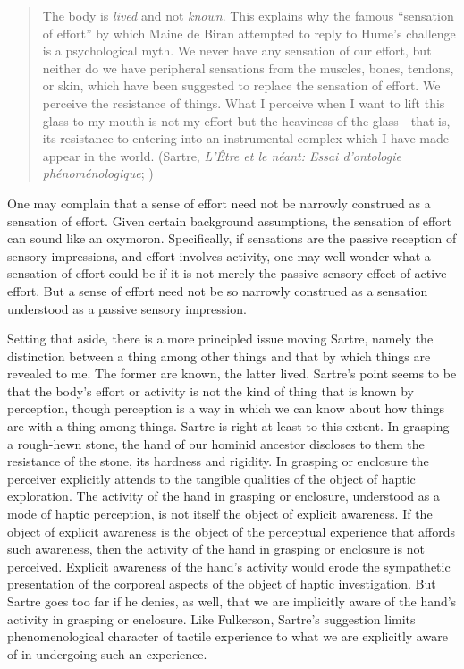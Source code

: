 \begin{quote}
	The body is \emph{lived} and not \emph{known}. This explains why the famous ``sensation of effort'' by which Maine de Biran attempted to reply to Hume's challenge is a psychological myth. We never have any sensation of our effort, but neither do we have peripheral sensations from the muscles, bones, tendons, or skin, which have been suggested to replace the sensation of effort. We perceive the resistance of things. What I perceive when I want to lift this glass to my mouth is not my effort but the heaviness of the glass---that is, its resistance to entering into an instrumental complex which I have made appear in the world. (Sartre, \emph{L'Être et le néant: Essai d'ontologie phénoménologique}; \citealt[324]{Barnes:1958rt})
\end{quote}
One may complain that a sense of effort need not be  narrowly construed as a sensation of effort. Given certain background assumptions, the sensation of effort can sound like an oxymoron. Specifically, if sensations are the passive reception of sensory impressions, and effort involves activity, one may well wonder what a sensation of effort could be if it is not merely the passive sensory effect of active effort. But a sense of effort need not be so narrowly construed as a sensation understood as a passive sensory impression. 

Setting that aside, there is a more principled issue moving Sartre, namely the distinction between a thing among other things and that by which things are revealed to me. The former are known, the latter lived. Sartre's point seems to be that the body's effort or activity is not the kind of thing that is known by perception, though perception is a way in which we can know about how things are with a thing among things. Sartre is right at least to this extent. In grasping a rough-hewn stone, the hand of our hominid ancestor discloses to them the resistance of the stone, its hardness and rigidity. In grasping or enclosure the perceiver explicitly attends to the tangible qualities of the object of haptic exploration. The activity of the hand in grasping or enclosure, understood as a mode of haptic perception, is not itself the object of explicit awareness. If the object of explicit awareness is the object of the perceptual experience that affords such awareness, then the activity of the hand in grasping or enclosure is not perceived. Explicit awareness of the hand's activity would erode the sympathetic presentation of the corporeal aspects of the object of haptic investigation. But Sartre goes too far if he denies, as well, that we are implicitly aware of the hand's activity in grasping or enclosure. Like Fulkerson, Sartre's suggestion limits phenomenological character of tactile experience to what we are explicitly aware of in undergoing such an experience.

